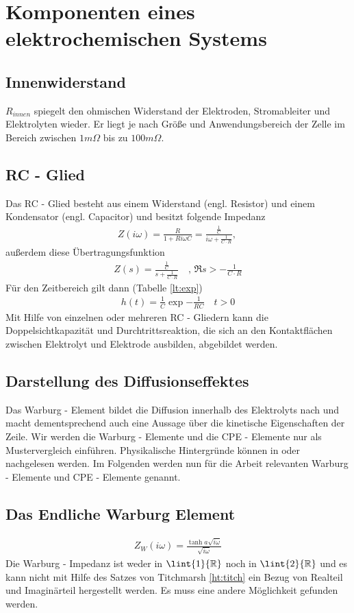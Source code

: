 \section{Komponenten eines elektrochemischen Systems}
\subsection{Innenwiderstand}
$R_{innen}$ spiegelt den ohmischen Widerstand der Elektroden, Stromableiter und Elektrolyten wieder. Er liegt je nach Größe und Anwendungsbereich der Zelle im Bereich zwischen $1 m\Omega$ bis zu $100 m\Omega$.
\subsection{RC - Glied}
Das RC - Glied besteht aus einem Widerstand (engl. Resistor) und einem Kondensator (engl. Capacitor) 
und besitzt folgende Impedanz
\begin{align}
	Z(i \omega) = \frac{R}{1+ R i \omega C } = \frac{\frac{1}{C}}{i \omega + \frac{1}{C \cdot R}} \label{mod:rc:gl} \text{, }
\end{align}
außerdem diese Übertragungsfunktion 
\begin{align}
Z(s) = \frac{\frac{1}{C}}{s + \frac{1}{C \cdot R}} \quad \text{, } \Re{s} > - \frac{1}{C \cdot R}\label{mod:RC:trans}
\end{align}
Für den Zeitbereich gilt dann (Tabelle \ref{lt:exp})
\begin{align}
	h(t) =  \frac{1}{C} \exp{- \frac{1}{R C}}  \quad t  > 0 \label{mod:RC:time}
\end{align}
Mit Hilfe von einzelnen oder mehreren RC - Gliedern kann die Doppelsichtkapazität und Durchtrittsreaktion, die sich an den Kontaktflächen zwischen  Elektrolyt und Elektrode ausbilden, abgebildet werden. 

\subsection{Darstellung des Diffusionseffektes}
Das Warburg - Element bildet die Diffusion innerhalb des Elektrolyts nach und macht dementsprechend auch eine Aussage über die kinetische Eigenschaften der Zeile. Wir werden die Warburg - Elemente und die CPE - Elemente nur als Mustervergleich einführen. Physikalische Hintergründe können in \cite{Mauracher1996} oder \cite{MacDonald2005} nachgelesen werden. Im Folgenden werden nun für die Arbeit relevanten Warburg - Elemente und CPE - Elemente genannt.
\subsection{Das Endliche Warburg Element} \label{mod:warburg}
\begin{align}
	Z_{W}(i \omega) = \frac{\tanh{a \sqrt{i \omega}}}{\sqrt{i \omega}}  \label{mod:warburg:gl}
\end{align}
Die Warburg - Impedanz ist weder in $\lint{1}{\mathbb{R}}$ noch in $\lint{2}{\mathbb{R}}$ und es kann nicht mit Hilfe des Satzes von Titchmarsh \ref{ht:titch} ein Bezug von Realteil und Imaginärteil hergestellt werden. Es muss eine andere Möglichkeit gefunden werden. \\
